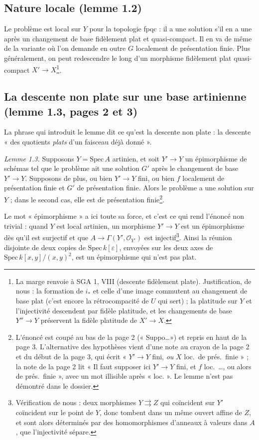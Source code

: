 \documentclass[11pt,a4paper]{article}
\begin{document}
\subsection*{Nature locale (lemme 1.2)}

Le problème est local sur $Y$ pour la topologie fpqc : il a une solution
s'il en a une après un changement de base fidèlement plat et
quasi-compact. Il en va de même de la variante où l'on demande en outre $G$
localement de présentation finie. Plus généralement, on peut redescendre le
long d'un morphisme fidèlement plat quasi-compact $X' \to X$\footnote{La marge
renvoie à SGA 1, VIII (descente fidèlement plate). Justification, de nous :
la formation de $i_*$ et celle d'une image commutent au changement de base
plat (c'est encore la rétrocompacité de $U$ qui sert) ; la platitude sur $Y$
et l'injectivité descendent par fidèle platitude, et les changements de base
$Y'' \to Y$ préservent la fidèle platitude de $X' \to X$.}.

\subsection*{La descente non plate sur une base artinienne (lemme 1.3, pages 2 et 3)}

La phrase qui introduit le lemme dit ce qu'est la descente non plate : la
descente « des quotients \emph{plats} d'un faisceau déjà donné ».

\emph{Lemme 1.3.} Supposons $Y = \mathrm{Spec}\, A$ artinien, et soit
$Y' \to Y$ un épimorphisme de schémas tel que le problème ait une solution
$G'$ après le changement de base $Y' \to Y$. Supposons de plus, ou bien
$Y' \to Y$ fini, ou bien $f$ localement de présentation finie et $G'$ de
présentation finie. Alors le problème a une solution sur $Y$ ; dans le second
cas, elle est de présentation finie\footnote{L'énoncé est coupé au bas de la
page 2 (« Suppo\ldots ») et repris en haut de la page 3. L'alternative des
hypothèses vient d'une note au crayon de la page 2 et du début de la page
3, qui écrit « $Y' \to Y$ fini, \emph{ou} $X$ loc.\ de prés.\ finie » ; la
note de la page 2 lit « Il faut supposer ici $Y' \to Y$ fini, et $f$ loc.\
\ldots, ou alors de prés.\ finie », avec un mot illisible après « loc. ». Le
lemme n'est pas démontré dans le dossier.}.

Le mot « épimorphisme » a ici toute sa force, et c'est ce qui rend
l'énoncé non trivial : quand $Y$ est local artinien, un morphisme
$Y' \to Y$ est un épimorphisme dès qu'il est surjectif et que
$A \to \Gamma(Y', \mathcal{O}_{Y'})$ est injectif\footnote{Vérification de
nous : deux morphismes $Y \rightrightarrows Z$ qui coïncident sur $Y'$
coïncident sur le point de $Y$, donc tombent dans un même ouvert affine de
$Z$, et sont alors déterminés par des homomorphismes d'anneaux à valeurs dans
$A$, que l'injectivité sépare.}. Ainsi la réunion disjointe de deux copies
de $\mathrm{Spec}\, k[\varepsilon]$, envoyées sur les deux axes de
$\mathrm{Spec}\, k[x,y]/(x,y)^2$, est un épimorphisme qui n'est pas plat.
\end{document}
